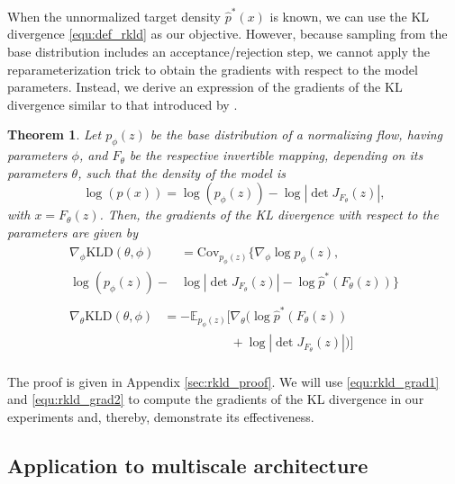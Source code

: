 \documentclass[twoside]{article}
\newtheorem{theorem}{Theorem}
\newcommand{\KLD}{\mathrm{KLD}}
\newcommand{\Cov}{\mathrm{Cov}}
\newcommand{\E}{\mathds{E}}
\begin{document}
When the unnormalized target density $\hat{p}^*(x)$ is known, we can use the KL divergence \eqref{equ:def_rkld} as our objective. However, because sampling from the base distribution includes an acceptance/rejection step, we cannot apply the reparameterization trick \citep{Kingma2014} to obtain the gradients with respect to the model parameters. Instead, we derive an expression of the gradients of the KL divergence similar to that introduced by \cite{Grover2018b}.
\begin{theorem}
	\label{thm:rkld_grad}
	Let $p_\phi(z)$ be the base distribution of a normalizing flow, having parameters $\phi$, and $F_\theta$ be the respective invertible mapping, depending on its parameters $\theta$, such that the density of the model is
	\begin{equation}
		\log\left( p(x) \right) = \log\left( p_\phi(z) \right) - \log\left| \det J_{F_\theta}(z)\right| ,
		\label{equ:flow_with_param}
	\end{equation}
	with $x = F_\theta(z)$. Then, the gradients of the KL divergence with respect to the parameters are given by
	\begin{align}
	    \begin{split}
		\nabla_\phi \KLD(\theta, \phi) &= \Cov_{p_\phi(z)}\big\{ \nabla_\phi \log p_\phi(z), \\\log\left( p_\phi(z) \right) -& \log\left| \det J_{F_\theta}(z)\right|  - \log \hat{p}^*(F_\theta(z))\big\}
		\end{split}\label{equ:rkld_grad1}
		\\
		\begin{split}
		\nabla_\theta \KLD(\theta, \phi) &= -\E_{p_\phi(z)}\big[ \nabla_\theta \big( \log \hat{p}^*(F_\theta(z))  \\
		&\phantom{=-\E_{p_\phi(z)}\big[}+\log\left| \det J_{F_\theta}(z)\right| \big) \big]
		\end{split}\label{equ:rkld_grad2}
	\end{align}
\end{theorem}
The proof is given in Appendix \ref{sec:rkld_proof}. We will use \eqref{equ:rkld_grad1} and \eqref{equ:rkld_grad2} to compute the gradients of the KL divergence in our experiments and, thereby, demonstrate its effectiveness.


\subsection{Application to multiscale architecture}
\label{sec:method_multiscale}
\end{document}
